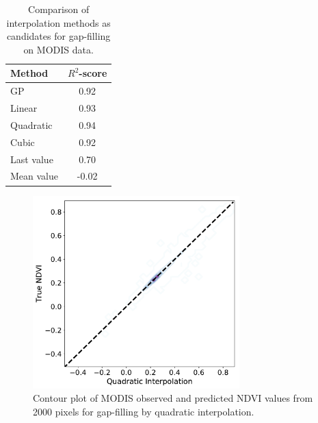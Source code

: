 \documentclass[review]{elsarticle}
\begin{document}
\begin{table}
	\caption{Comparison of interpolation methods as candidates for gap-filling on MODIS data.
	} \label{tab:comp_int2}
	\centering
	\begin{tabular}{lc} 
		\toprule
		\textbf{Method}  & \textbf{$R^2$-score} \\
		\midrule
		GP & 0.92 \\
		Linear & 0.93\\
		Quadratic & 0.94\\
		Cubic & 0.92\\
		Last value & 0.70\\
		Mean value & -0.02\\
		\bottomrule
	\end{tabular}
\end{table}
\vspace{2cm}
\begin{figure}[H]
	\centering
	\includegraphics[trim = 30mm 5mm 5mm 15mm,width=8cm]{figures/QuadraticInt_contour.pdf} 
	\caption{Contour plot of MODIS observed and predicted NDVI values from 2000 pixels for gap-filling by quadratic interpolation.} \label{fig:interpScatter}
\end{figure}

\end{document}
